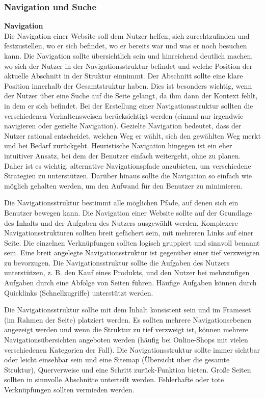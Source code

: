 \documentclass[utf8,biblatex]{lni}
\begin{document}
\subsubsection{Navigation und Suche}
\textbf{Navigation}\\
Die Navigation einer Website soll dem Nutzer helfen, sich zurechtzufinden und festzustellen, wo er sich befindet, wo er bereits war und was er noch besuchen kann. Die Navigation sollte übersichtlich sein und hinreichend deutlich machen, wo sich der Nutzer in der Navigationsstruktur befindet und welche Position der aktuelle Abschnitt in der Struktur einnimmt. Der Abschnitt sollte eine klare Position innerhalb der Gesamtstruktur haben. Dies ist besonders wichtig, wenn der Nutzer über eine Suche auf die Seite gelangt, da ihm dann der Kontext fehlt, in dem er sich befindet. Bei der Erstellung einer Navigationsstruktur sollten die verschiedenen Verhaltensweisen berücksichtigt werden (einmal nur irgendwie navigieren oder gezielte Navigation). Gezielte Navigation bedeutet, dass der Nutzer rational entscheidet, welchen Weg er wählt, sich den gewählten Weg merkt und bei Bedarf zurückgeht. Heuristische Navigation hingegen ist ein eher intuitiver Ansatz, bei dem der Benutzer einfach weitergeht, ohne zu planen. Daher ist es wichtig, alternative Navigationspfade anzubieten, um verschiedene Strategien zu unterstützen. Darüber hinaus sollte die Navigation so einfach wie möglich gehalten werden, um den Aufwand für den Benutzer zu minimieren.

Die Navigationsstruktur bestimmt alle möglichen Pfade, auf denen sich ein Benutzer bewegen kann. Die Navigation einer Website sollte auf der Grundlage des Inhalts und der Aufgaben des Nutzers ausgewählt werden. Komplexere Navigationsstrukturen sollten breit gefächert sein, mit mehreren Links auf einer Seite. Die einzelnen Verknüpfungen sollten logisch gruppiert und sinnvoll benannt sein. Eine breit angelegte Navigationsstruktur ist gegenüber einer tief verzweigten zu bevorzugen. Die Navigationsstruktur sollte die Aufgaben des Nutzers unterstützen, z. B. den Kauf eines Produkts, und den Nutzer bei mehrstufigen Aufgaben durch eine Abfolge von Seiten führen. Häufige Aufgaben können durch Quicklinks (Schnellzugriffe) unterstützt werden. 

Die Navigationsstruktur sollte mit dem Inhalt konsistent sein und im Frameset (im Rahmen der Seite) platziert werden. Es sollten mehrere Navigationsebenen angezeigt werden und wenn die Struktur zu tief verzweigt ist, können mehrere Navigationsübersichten angeboten werden (häufig bei Online-Shops mit vielen verschiedenen Kategorien der Fall). Die Navigationsstruktur sollte immer sichtbar oder leicht einsehbar sein und eine Sitemap (Übersicht über die gesamte Struktur), Querverweise und eine \glqq{}Schritt zurück\grqq-Funktion bieten. Große Seiten sollten in sinnvolle Abschnitte unterteilt werden. Fehlerhafte oder tote Verknüpfungen sollten vermieden werden.
\end{document}
